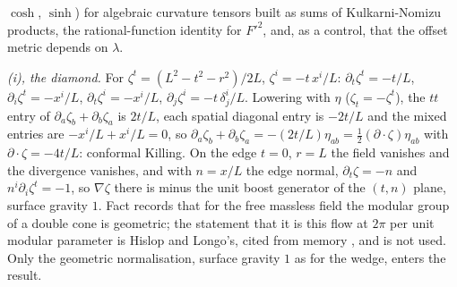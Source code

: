 $\cosh$, $\sinh$) for algebraic curvature tensors built as sums of Kulkarni-Nomizu products, the rational-function identity for $F'^{2}$, and, as a control, that the offset metric depends on $\lambda$.

\emph{(i), the diamond.} For $\zeta^{t} = (L^{2} - t^{2} - r^{2})/2L$, $\zeta^{i} = -t\,x^{i}/L$: $\partial_{t}\zeta^{t} = -t/L$, $\partial_{i}\zeta^{t} = -x^{i}/L$, $\partial_{t}\zeta^{i} = -x^{i}/L$, $\partial_{j}\zeta^{i} = -t\,\delta^{i}_{j}/L$. Lowering with $\eta$ ($\zeta_{t} = -\zeta^{t}$), the $tt$ entry of $\partial_{a}\zeta_{b} + \partial_{b}\zeta_{a}$ is $2t/L$, each spatial diagonal entry is $-2t/L$ and the mixed entries are $-x^{i}/L + x^{i}/L = 0$, so $\partial_{a}\zeta_{b} + \partial_{b}\zeta_{a} = -(2t/L)\eta_{ab} = \tfrac12(\partial\cdot\zeta)\eta_{ab}$ with $\partial\cdot\zeta = -4t/L$: conformal Killing. On the edge $t = 0$, $r = L$ the field vanishes and the divergence vanishes, and with $n = x/L$ the edge normal, $\partial_{t}\zeta = -n$ and $n^{i}\partial_{i}\zeta^{t} = -1$, so $\nabla\zeta$ there is minus the unit boost generator of the $(t, n)$ plane, surface gravity $1$. Fact  records that for the free massless field the modular group of a double cone is geometric; the statement that it is this flow at $2\pi$ per unit modular parameter is Hislop and Longo's, cited from memory \cite{HislopLongo1982}, and is not used. Only the geometric normalisation, surface gravity $1$ as for the wedge, enters the result.

